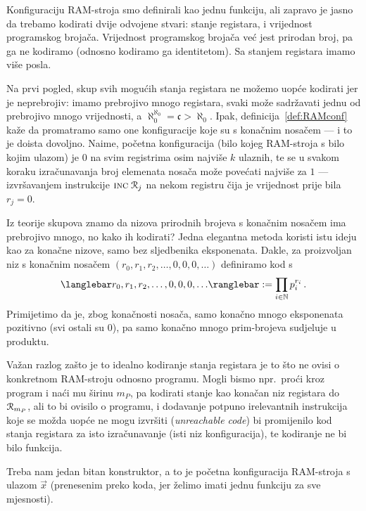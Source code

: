 Konfiguraciju RAM-stroja smo definirali kao jednu funkciju, ali zapravo je jasno da trebamo kodirati dvije odvojene stvari: stanje registara, i vrijednost programskog brojača. Vrijednost programskog brojača već jest prirodan broj, pa ga ne kodiramo (odnosno kodiramo ga identitetom). Sa stanjem registara imamo više posla.

Na prvi pogled, skup svih mogućih stanja registara ne možemo uopće kodirati jer je neprebrojiv: imamo prebrojivo mnogo registara, svaki može sadržavati jednu od prebrojivo mnogo vrijednosti, a $\aleph_0^{\aleph_0}=\mathfrak c>\aleph_0$. Ipak, definicija~\ref{def:RAMconf} kaže da promatramo samo one konfiguracije koje su s konačnim nosačem --- i to je doista dovoljno. Naime, početna konfiguracija (bilo kojeg RAM-stroja s bilo kojim ulazom) je $0$ na svim registrima osim najviše $k$ ulaznih, te se u svakom koraku izračunavanja broj elemenata nosača može povećati najviše za $1$ --- izvršavanjem instrukcije $\textsc{inc}\;\mathcal R_{j}$ na nekom registru čija je vrijednost prije bila $r_j=0$.

Iz teorije skupova znamo da nizova prirodnih brojeva s konačnim nosačem ima prebrojivo mnogo, no kako ih kodirati? Jedna elegantna metoda koristi istu ideju kao za konačne nizove, samo bez sljedbenika eksponenata. Dakle, za proizvoljan niz s konačnim nosačem $(r_0,r_1,r_2,\dotsc,0,0,0,\dotsc)$ definiramo kod s
\begin{equation}\label{eq:defkreg}
    \knk{r_0,r_1,r_2,\dotsc,0,0,0,\dotsc}:=\prod_{i\in\N}p_i^{r_i}\,\text.
\end{equation}
Primijetimo da je, zbog konačnosti nosača, samo konačno mnogo eksponenata pozitivno (svi ostali su $0$), pa samo konačno mnogo prim-brojeva sudjeluje u produktu.

Važan razlog zašto je to idealno kodiranje stanja registara je to što 
ne ovisi o konkretnom RAM-stroju odnosno programu. Mogli bismo npr.\ proći kroz program i naći mu širinu $m_P$, pa kodirati stanje kao konačan niz registara do $\mathcal R_{m_P}$, ali to bi ovisilo o programu, i dodavanje potpuno irelevantnih instrukcija koje se možda uopće ne mogu izvršiti (\emph{unreachable code}) bi promijenilo kod stanja registara za isto izračunavanje (isti niz konfiguracija), te kodiranje ne bi bilo funkcija.

Treba nam jedan bitan konstruktor, a to je %
početna konfiguracija RAM-stroja s ulazom $\vec x$ (prenesenim preko koda, jer želimo imati jednu funkciju za sve mjesnosti).

